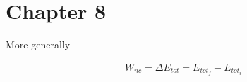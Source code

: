 \section{Chapter 8}

	More generally

	\begin{align}
		W_{nc} = \Delta E_{tot}
		= E_{tot_{f}} - E_{tot_{i}}
	\end{align}

